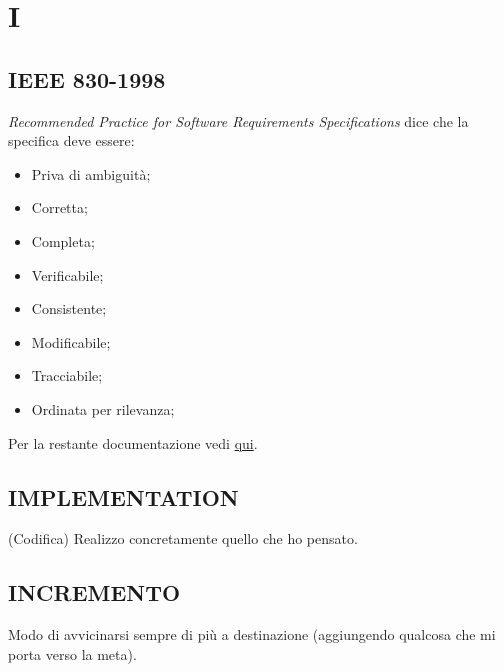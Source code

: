 \newpage
	\flushright{\hyperref[index]{\color{black!65}{Ritorna all'indice}}}\flushleft
	\section{I} \label{sec:I}
	
		\subsection{IEEE 830-1998}	 \label{ieee830}
		\textit{Recommended Practice for Software Requirements Specifications} dice che la specifica deve essere:
			\begin{itemize}
				\item Priva di ambiguità;
				\item Corretta;
				\item Completa;
				\item Verificabile;
				\item Consistente;
				\item Modificabile;
				\item Tracciabile;
				\item Ordinata per rilevanza;
			\end{itemize}
		Per la restante documentazione vedi \href{https://www.cs.purdue.edu/homes/apm/courses/BITSC461-fall03/miller-guidelines/IEEE830-1998.html}{qui}.
	
		\subsection{IMPLEMENTATION}  \label{implementation}
		(Codifica) Realizzo concretamente quello che ho pensato.
		
		\subsection{INCREMENTO}  \label{incremento}
		Modo di avvicinarsi sempre di più a destinazione (aggiungendo qualcosa che mi porta verso la meta).
		
